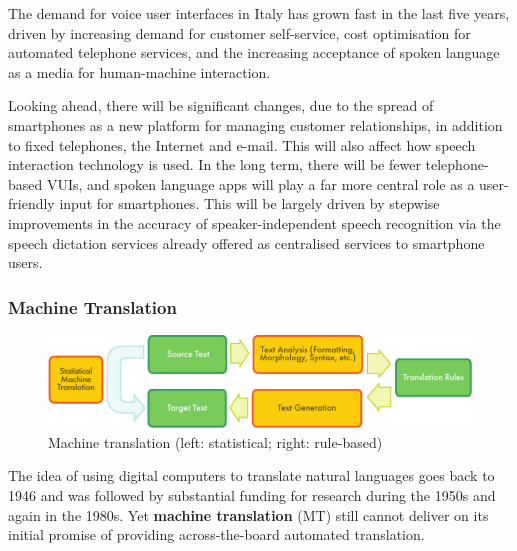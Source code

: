 \begin{multicols}{2}
The demand for voice user interfaces in Italy has grown fast in the last five years, driven by increasing demand for customer self-service, cost optimisation for automated telephone services, and the increasing acceptance of spoken language as a media for human-machine interaction.

Looking ahead, there will be significant changes, due to the spread of smartphones as a new platform for managing customer relationships, in addition to fixed telephones, the Internet and e-mail. This will also affect how speech interaction technology is used. In the long term, there will be fewer telephone-based VUIs, and spoken language apps will play a far more central role as a user-friendly input for smartphones. This will be largely driven by stepwise improvements in the accuracy of speaker-independent speech recognition via the speech dictation services already offered as centralised services to smartphone users.

\subsubsection{Machine Translation}

\begin{figure}[htb]
  \center
  \includegraphics[width=\textwidth]{../_media/english/machine_translation}
  \caption{Machine translation (left: statistical; right: rule-based)}
\label{fig:mtarch_en}
\end{figure}

The idea of using digital computers to translate natural languages
goes back to 1946 and was followed by substantial funding for research
during the 1950s and again in the 1980s. Yet \textbf{machine
  translation} (MT) still cannot deliver on its initial promise of
providing across-the-board automated translation.  




\end{multicols}
